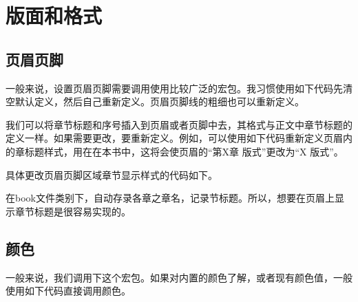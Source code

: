 \newpage

{\let\clearpage\relax \chapter{版面和格式}}

\section{页眉页脚}
一般来说，设置页眉页脚需要调用使用比较广泛的宏包。我习惯使用如下代码先清空默认定义，然后自己重新定义。页眉页脚线的粗细也可以重新定义。

\begin{latex}{}
\usepackage{fancyhdr}
\pagestyle{fancy}
\fancyhf{}					%
	\lhead{}				%
	\cfoot{}
	\fancyhead[RO,LE]{}		%
	\fancyfoot[LE,RO]{\thepage}
\renewcommand{\headrulewidth}{0.4 pt}
\renewcommand{\footrulewidth}{0.4 pt}
\end{latex}


我们可以将章节标题和序号插入到页眉或者页脚中去，其格式与正文中章节标题的定义一样。如果需要更改，要重新定义。例如，可以使用如下代码重新定义页眉内的章标题样式，用在在本书中，这将会使页眉的“第X章 版式”更改为“X 版式”。 

具体更改页眉页脚区域章节显示样式的代码如下。

\begin{latex}{}
	\renewcommand{\chaptermark}[1]{\markleft{\thesection.\#1}}
\renewcommand{\chaptermark}[1]{\markboth{\thechapter.\ #1}{节样式空置表示修改章样式}}
\renewcommand{\chaptermark}[1]{\markboth{章样式}{节样式}}
\end{latex}


在book文件类别下，\qd{\leftmark}自动存录各章之章名，\qd{\rightmark}记录节标题。所以，想要在页眉上显示章节标题是很容易实现的。


\begin{latex}{}
\lhead{\leftmark}			%
\rhead{\rightmark}			%
\end{latex}


\section{颜色}
一般来说，我们调用下这个宏包。如果对内置的颜色了解，或者现有颜色值，一般使用如下代码直接调用颜色。

\begin{center}
	\color[RGB]{204, 128, 92}{Color Text中文测试}
\end{center}

